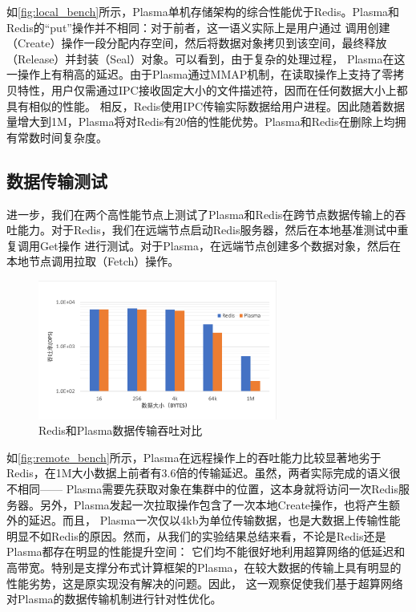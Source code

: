 如\autoref{fig:local_bench}所示，Plasma单机存储架构的综合性能优于Redis。Plasma和Redis的“put”操作并不相同：对于前者，这一语义实际上是用户通过
调用创建（Create）操作一段分配内存空间，然后将数据对象拷贝到该空间，最终释放（Release）并封装（Seal）对象。可以看到，由于复杂的处理过程，
Plasma在这一操作上有稍高的延迟。由于Plasma通过MMAP机制，在读取操作上支持了零拷贝特性，用户仅需通过IPC接收固定大小的文件描述符，因而在任何数据大小上都具有相似的性能。
相反，Redis使用IPC传输实际数据给用户进程。因此随着数据量增大到1M，Plasma将对Redis有20倍的性能优势。Plasma和Redis在删除上均拥有常数时间复杂度。

\subsection{数据传输测试}

进一步，我们在两个高性能节点上测试了Plasma和Redis在跨节点数据传输上的吞吐能力。对于Redis，我们在远端节点启动Redis服务器，然后在本地基准测试中重复调用Get操作
进行测试。对于Plasma，在远端节点创建多个数据对象，然后在本地节点调用拉取（Fetch）操作。

\begin{figure}[h]
    \centering
    \includegraphics[width=0.7\textwidth]{image/chap02/fetch.png}
    \caption{Redis和Plasma数据传输吞吐对比}
    \label{fig:remote_bench}
\end{figure}

如\autoref{fig:remote_bench}所示，Plasma在远程操作上的吞吐能力比较显著地劣于Redis，在1M大小数据上前者有3.6倍的传输延迟。虽然，两者实际完成的语义很不相同——
Plasma需要先获取对象在集群中的位置，这本身就将访问一次Redis服务器。另外，Plasma发起一次拉取操作包含了一次本地Create操作，也将产生额外的延迟。而且，
Plasma一次仅以4kb为单位传输数据，也是大数据上传输性能明显不如Redis的原因。然而，从我们的实验结果总结来看，不论是Redis还是Plasma都存在明显的性能提升空间：
它们均不能很好地利用超算网络的低延迟和高带宽。特别是支撑分布式计算框架的Plasma，在较大数据的传输上具有明显的性能劣势，这是原实现没有解决的问题。因此，
这一观察促使我们基于超算网络对Plasma的数据传输机制进行针对性优化。